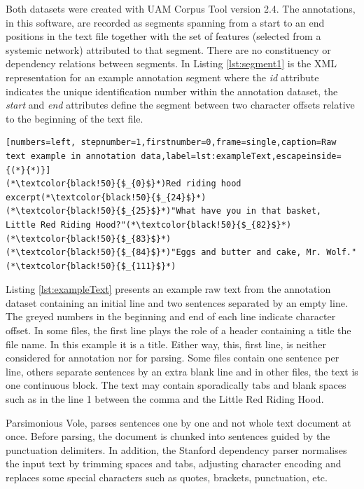 Both datasets were created with UAM Corpus Tool \citep{ODonnell2008,ODonnell2008a} version 2.4. The annotations, in this software, are recorded as segments spanning from a start to an end positions in the text file together with the set of features (selected from a systemic network) attributed to that segment. There are no constituency or dependency relations between segments. In Listing \ref{lst:segment1} is the XML representation for an example annotation segment where the \textit{id} attribute indicates the unique identification number within the annotation dataset, the \textit{start} and \textit{end} attributes define the segment between two character offsets relative to the beginning of the text file. 

\begin{lstlisting}[numbers=left, stepnumber=1,firstnumber=0,frame=single,caption=Raw text example in annotation data,label=lst:exampleText,escapeinside={(*}{*)}]
(*\textcolor{black!50}{$_{0}$}*)Red riding hood excerpt(*\textcolor{black!50}{$_{24}$}*)
(*\textcolor{black!50}{$_{25}$}*)"What have you in that basket,   Little Red Riding Hood?"(*\textcolor{black!50}{$_{82}$}*)
(*\textcolor{black!50}{$_{83}$}*)
(*\textcolor{black!50}{$_{84}$}*)"Eggs and butter and cake, Mr. Wolf."(*\textcolor{black!50}{$_{111}$}*)
\end{lstlisting}

Listing \ref{lst:exampleText} presents an example raw text from the annotation dataset containing an initial line and two sentences separated by an empty line. The greyed numbers in the beginning and end of each line indicate character offset. In some files, the first line plays the role of a header containing a title the file name. In this example it is a title. Either way, this, first line, is neither considered for annotation nor for parsing. Some files contain one sentence per line, others separate sentences by an extra blank line and in other files, the text is one continuous block. The text may  contain sporadically tabs and blank spaces such as in the line 1 between the comma and the Little Red Riding Hood. 

Parsimonious Vole, parses sentences one by one and not whole text document at once. Before parsing, the document is chunked into sentences guided by the punctuation delimiters. In addition, the Stanford dependency parser normalises the input text by trimming spaces and tabs, adjusting character encoding and replaces some special characters such as quotes, brackets, punctuation, etc.

